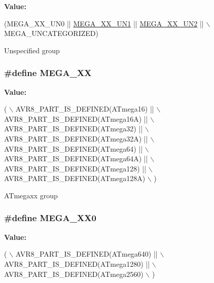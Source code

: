 {\bfseries Value\-:}
\begin{DoxyCode}
(MEGA\_XX\_UN0 || \hyperlink{group__mega__part__macros__group_gaad35e34280ef078dec0cc18c3ea6d3f6}{MEGA\_XX\_UN1} || \hyperlink{group__mega__part__macros__group_ga5f4566d4ddaa3cee92d4c78162594f2d}{MEGA\_XX\_UN2} || \(\backslash\)
        MEGA\_UNCATEGORIZED)
\end{DoxyCode}
Unspecified group \hypertarget{group__mega__part__macros__group_gabdf992a84b61d19055315a473c2e0f20}{
\subsubsection[{M\-E\-G\-A\-\_\-\-X\-X}]{\setlength{\rightskip}{0pt plus 5cm}\#define M\-E\-G\-A\-\_\-\-X\-X}}\label{group__mega__part__macros__group_gabdf992a84b61d19055315a473c2e0f20}
{\bfseries Value\-:}
\begin{DoxyCode}
( \(\backslash\)
                AVR8\_PART\_IS\_DEFINED(ATmega16)   || \(\backslash\)
                AVR8\_PART\_IS\_DEFINED(ATmega16A)  || \(\backslash\)
                AVR8\_PART\_IS\_DEFINED(ATmega32)   || \(\backslash\)
                AVR8\_PART\_IS\_DEFINED(ATmega32A)  || \(\backslash\)
                AVR8\_PART\_IS\_DEFINED(ATmega64)   || \(\backslash\)
                AVR8\_PART\_IS\_DEFINED(ATmega64A)  || \(\backslash\)
                AVR8\_PART\_IS\_DEFINED(ATmega128)  || \(\backslash\)
                AVR8\_PART\_IS\_DEFINED(ATmega128A) \(\backslash\)
                )
\end{DoxyCode}
A\-Tmegaxx group \hypertarget{group__mega__part__macros__group_gad59dc6f3c3dc91c94cd1673448135b83}{
\subsubsection[{M\-E\-G\-A\-\_\-\-X\-X0}]{\setlength{\rightskip}{0pt plus 5cm}\#define M\-E\-G\-A\-\_\-\-X\-X0}}\label{group__mega__part__macros__group_gad59dc6f3c3dc91c94cd1673448135b83}
{\bfseries Value\-:}
\begin{DoxyCode}
( \(\backslash\)
                AVR8\_PART\_IS\_DEFINED(ATmega640)  || \(\backslash\)
                AVR8\_PART\_IS\_DEFINED(ATmega1280) || \(\backslash\)
                AVR8\_PART\_IS\_DEFINED(ATmega2560) \(\backslash\)
                )
\end{DoxyCode}
